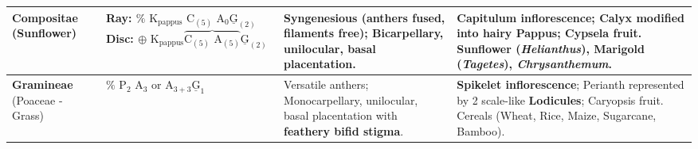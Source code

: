 \documentclass[10pt,a4paper]{article}
\begin{document}
\begin{conceptbox}
\begin{center}
\begin{tabular}{|p{1.9cm}|p{3.4cm}|p{2.9cm}|p{6.4cm}|}
\hline
\textbf{Compositae} (Sunflower) & Ray: $\% \text{ K}_{\text{pappus}} \text{ C}_{(5)} \text{ A}_0 \underline{\text{G}}_{(2)}$ \newline Disc: $\oplus \text{ K}_{\text{pappus}} \overbrace{\text{C}_{(5)} \text{ A}_{(5)}} \underline{\text{G}}_{(2)}$ & \textbf{Syngenesious} (anthers fused, filaments free); Bicarpellary, unilocular, \textbf{basal placentation}. & \textbf{Capitulum inflorescence}; Calyx modified into hairy \textbf{Pappus}; Cypsela fruit. Sunflower (\textit{Helianthus}), Marigold (\textit{Tagetes}), \textit{Chrysanthemum}. \\
\hline
\textbf{Gramineae} (Poaceae - Grass) & $\% \text{ P}_2 \text{ A}_3 \text{ or } \text{A}_{3+3} \underline{\text{G}}_1$ & Versatile anthers; Monocarpellary, unilocular, basal placentation with \textbf{feathery bifid stigma}. & \textbf{Spikelet inflorescence}; Perianth represented by 2 scale-like \textbf{Lodicules}; Caryopsis fruit. Cereals (Wheat, Rice, Maize, Sugarcane, Bamboo). \\
\hline
\end{tabular}
\end{center}
\end{conceptbox}
\end{document}
